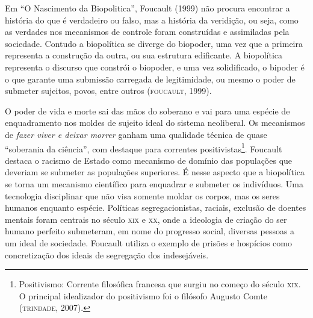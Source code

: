 \noindent{}Em ``O Nascimento da Biopolitica'', Foucault (1999) não procura
encontrar a história do que é verdadeiro ou falso, mas a história da
veridição, ou seja, como as verdades nos mecanismos de controle foram
construídas e assimiladas pela sociedade. Contudo a biopolítica se
diverge do biopoder, uma vez que a primeira representa a construção da
outra, ou sua estrutura edificante. A biopolítica representa o discurso
que constrói o biopoder, e uma vez solidificado, o bipoder é o que
garante uma submissão carregada de legitimidade, ou mesmo o poder de
submeter sujeitos, povos, entre outros (\textsc{foucault}, 1999).

O poder de vida e morte sai das mãos do soberano e vai para uma espécie
de enquadramento nos moldes de sujeito ideal do sistema neoliberal. Os
mecanismos de \emph{fazer viver e deixar morrer} ganham uma qualidade
técnica de quase ``soberania da ciência'', com destaque para correntes
positivistas\footnote{Positivismo: Corrente filosófica francesa que
  surgiu no começo do século \textsc{xix}. O principal idealizador do positivismo
  foi o filósofo Augusto Comte (\textsc{trindade}, 2007).}. Foucault destaca o
racismo de Estado como mecanismo de domínio das populações que deveriam
se submeter as populações superiores. É nesse aspecto que a biopolítica
se torna um mecanismo científico para enquadrar e submeter os
indivíduos. Uma tecnologia disciplinar que não visa somente moldar os
corpos, mas os seres humanos enquanto espécie. Políticas
segregacionistas, raciais, exclusão de doentes mentais foram centrais no
século \textsc{xix} e \textsc{xx}, onde a ideologia de criação do ser humano perfeito
submeteram, em nome do progresso social, diversas pessoas a um
ideal de sociedade. Foucault utiliza o exemplo de prisões e hospícios
como concretização dos ideais de segregação dos indesejáveis.

